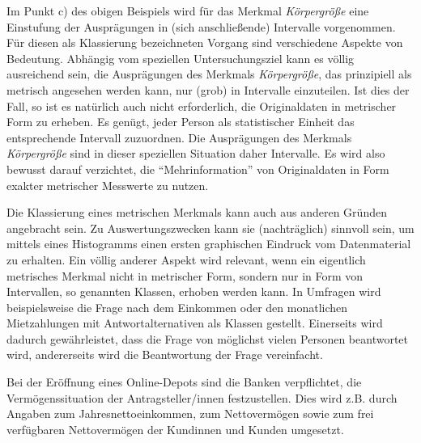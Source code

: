 \documentclass{lecture}
\begin{document}
    Im Punkt c) des obigen Beispiels wird für das Merkmal \emph{Körpergröße} eine Einstufung der Ausprägungen in (sich anschließende) Intervalle vorgenommen.
    Für diesen als Klassierung bezeichneten Vorgang sind verschiedene Aspekte von Bedeutung.
    Abhängig vom speziellen Untersuchungsziel kann es völlig ausreichend sein, die Ausprägungen des Merkmals \emph{Körpergröße}, das prinzipiell als metrisch angesehen werden kann, nur (grob) in Intervalle einzuteilen.
    Ist dies der Fall, so ist es natürlich auch nicht erforderlich, die Originaldaten in metrischer Form zu erheben.
    Es genügt, jeder Person als statistischer Einheit das entsprechende Intervall zuzuordnen.
    Die Ausprägungen des Merkmals \emph{Körpergröße} sind in dieser speziellen Situation daher Intervalle.
    Es wird also bewusst darauf verzichtet, die ``Mehrinformation'' von Originaldaten in Form exakter metrischer Messwerte zu nutzen.

    Die Klassierung eines metrischen Merkmals kann auch aus anderen Gründen angebracht sein.
    Zu Auswertungszwecken kann sie (nachträglich) sinnvoll sein, um mittels eines Histogramms einen ersten graphischen Eindruck vom Datenmaterial zu erhalten.
    Ein völlig anderer Aspekt wird relevant, wenn ein eigentlich metrisches Merkmal nicht in metrischer Form, sondern nur in Form von Intervallen, so genannten Klassen, erhoben werden kann.
    In Umfragen wird beispielsweise die Frage nach dem Einkommen oder den monatlichen Mietzahlungen mit Antwortalternativen als Klassen gestellt.
    Einerseits wird dadurch gewährleistet, dass die Frage von möglichst vielen Personen beantwortet wird, andererseits wird die Beantwortung der Frage vereinfacht.

    \begin{example}
        Bei der Eröffnung eines Online-Depots sind die Banken verpflichtet, die Vermögenssituation der Antragsteller/innen festzustellen.
        Dies wird z.B. durch Angaben zum Jahresnettoeinkommen, zum Nettovermögen sowie zum frei verfügbaren Nettovermögen der Kundinnen und Kunden umgesetzt.
    \end{example}
\end{document}
